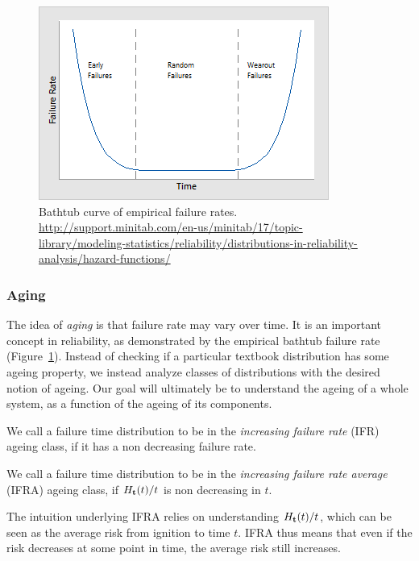\begin{figure}[ht]
\centering
\includegraphics[width=0.5\linewidth]{art/bathtub_curve}
\caption[Bathtub empirical hazard curve]{Bathtub curve of empirical failure rates. \newline
\url{http://support.minitab.com/en-us/minitab/17/topic-library/modeling-statistics/reliability/distributions-in-reliability-analysis/hazard-functions/}}
\label{fig:bathtub}
\end{figure}




\subsubsection{Aging}
The idea of \emph{aging} is that failure rate may vary over time. It is an important concept in reliability, as demonstrated by the empirical bathtub failure rate (Figure~\ref{fig:bathtub}).
Instead of checking if a particular textbook distribution has some ageing property, we instead analyze classes of distributions with the desired notion of ageing.
Our goal will ultimately be to understand the ageing of a whole system, as a function of the ageing of its components.

\begin{definition}[IFR]
We call a failure time distribution to be in the \emph{increasing failure rate} (IFR) ageing class, if it has a non decreasing failure rate.
\end{definition}


\begin{definition}[IFRA]
We call a failure time distribution to be in the \emph{increasing failure rate average} (IFRA) ageing class, if 
$H_{\mathbf{t}} (t)/t$ is non decreasing in $t$.
\end{definition}
The intuition underlying IFRA relies on understanding $H_{\mathbf{t}} (t)/t$, which can be seen as the average risk from ignition to time $t$. 
IFRA thus means that even if the risk decreases at some point in time, the average risk still increases. 



